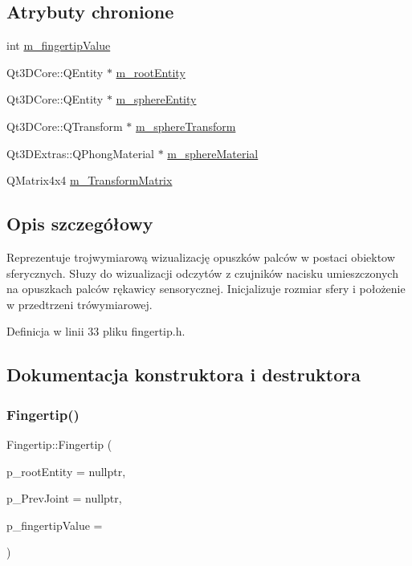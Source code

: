 \subsection*{Atrybuty chronione}
\begin{DoxyCompactItemize}
\item 
int \hyperlink{class_fingertip_a905ac81dfaa6237a3bf0bd799edee5ed}{m\+\_\+fingertip\+Value}
\item 
Qt3\+D\+Core\+::\+Q\+Entity $\ast$ \hyperlink{class_fingertip_aab2e37584c9728063525485253a8292e}{m\+\_\+root\+Entity}
\item 
Qt3\+D\+Core\+::\+Q\+Entity $\ast$ \hyperlink{class_fingertip_a48394c9bf6bbcef4e6b9fab82b561c61}{m\+\_\+sphere\+Entity}
\item 
Qt3\+D\+Core\+::\+Q\+Transform $\ast$ \hyperlink{class_fingertip_a0827f0c8eee7e8327d5ad8f74a2bc321}{m\+\_\+sphere\+Transform}
\item 
Qt3\+D\+Extras\+::\+Q\+Phong\+Material $\ast$ \hyperlink{class_fingertip_a58602637fb13017b27b8c635e614d1f5}{m\+\_\+sphere\+Material}
\item 
Q\+Matrix4x4 \hyperlink{class_fingertip_aeb9e6a84d8edba93cabbddafbcba04b2}{m\+\_\+\+Transform\+Matrix}
\end{DoxyCompactItemize}


\subsection{Opis szczegółowy}
Reprezentuje trojwymiarową wizualizację opuszków palców w postaci obiektow sferycznych. Słuzy do wizualizacji odczytów z czujników nacisku umieszczonych na opuszkach palców rękawicy sensorycznej. Inicjalizuje rozmiar sfery i położenie w przedtrzeni trówymiarowej. 

Definicja w linii 33 pliku fingertip.\+h.



\subsection{Dokumentacja konstruktora i destruktora}
\mbox{\label{class_fingertip_a06e4298ae73d30fb187a24d0830d230a}} 
\subsubsection{\texorpdfstring{Fingertip()}{Fingertip()}}
{\footnotesize\ttfamily Fingertip\+::\+Fingertip (\begin{DoxyParamCaption}\item[{Qt3\+D\+Core\+::\+Q\+Entity $\ast$}]{p\+\_\+root\+Entity = {\ttfamily nullptr},  }\item[{\hyperlink{class_joint}{Joint} $\ast$}]{p\+\_\+\+Prev\+Joint = {\ttfamily nullptr},  }\item[{int}]{p\+\_\+fingertip\+Value = {} }\end{DoxyParamCaption})\hspace{0.3cm}{\ttfamily [explicit]}}



